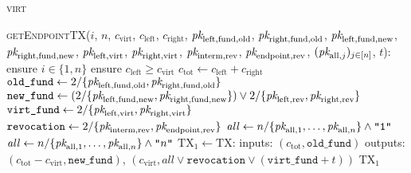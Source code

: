 \begin{center}
  \begin{processbox}{\textsc{virt}}
    \begin{algorithmic}[1]
      \State {}
      \State \textsc{getEndpointTX}($i$, $n$, $c_{\mathrm{virt}}$,
      $c_{\mathrm{left}}$, $c_{\mathrm{right}}$, $\textit{pk}_{\mathrm{left},
      \mathrm{fund}, \mathrm{old}}$, $\textit{pk}_{\mathrm{right}, \mathrm{fund},
      \mathrm{old}}$, $\textit{pk}_{\mathrm{left}, \mathrm{fund}, \mathrm{new}}$,
      $\textit{pk}_{\mathrm{right}, \mathrm{fund}, \mathrm{new}}$, $\textit{pk}_{\mathrm{left},
      \mathrm{virt}}$, $\textit{pk}_{\mathrm{right}, \mathrm{virt}}$,
      $\textit{pk}_{\mathrm{interm}, \mathrm{rev}}$, $\textit{pk}_{\mathrm{endpoint},
      \mathrm{rev}}$, $(\textit{pk}_{\mathrm{all}, j})_{j \in [n]}$, $t$):
      \Indent
        \State ensure $i \in \{1, n\}$
        \State ensure $c_{\mathrm{left}} \geq c_{\mathrm{virt}}$ 
        \State $c_{\mathrm{tot}} \gets c_{\mathrm{left}} + c_{\mathrm{right}}$
        \State $\texttt{old\_fund} \gets 2/\{\textit{pk}_{\mathrm{left}, \mathrm{fund},
        \mathrm{old}}, \textit{pk}_{\mathrm{right}, \mathrm{fund}, \mathrm{old}}\}$
        \State $\texttt{new\_fund} \gets (2/\{\textit{pk}_{\mathrm{left}, \mathrm{fund},
        \mathrm{new}}, \textit{pk}_{\mathrm{right}, \mathrm{fund}, \mathrm{new}}\}) \vee
        2/\{\textit{pk}_{\mathrm{left}, \mathrm{rev}}, \textit{pk}_{\mathrm{right},
        \mathrm{rev}}\}$
        \State $\texttt{virt\_fund} \gets 2/\{\textit{pk}_{\mathrm{left},
        \mathrm{virt}}, \textit{pk}_{\mathrm{right}, \mathrm{virt}}\}$
        \State $\texttt{revocation} \gets 2/\{\textit{pk}_{\mathrm{interm},
        \mathrm{rev}}, \textit{pk}_{\mathrm{endpoint}, \mathrm{rev}}\}$
         
          \State $\mathit{all} \gets n/\{\textit{pk}_{\mathrm{all}, 1}, \dots,
          \textit{pk}_{\mathrm{all}, n}\} \wedge \texttt{"1"}$
        \Else \: 
          \State $\mathit{all} \gets n/\{\textit{pk}_{\mathrm{all}, 1}, \dots,
          \textit{pk}_{\mathrm{all}, n}\} \wedge \texttt{"}n\texttt{"}$
        \EndIf
        \State $\mathrm{TX}_1 \gets \mathrm{TX}$: 
        \Indent
          \State inputs:
          \Indent
            \State $(c_{\mathrm{tot}}, \texttt{old\_fund})$
          \EndIndent
          \State outputs:
          \Indent
            \State $(c_{\mathrm{tot}} - c_{\mathrm{virt}}, \texttt{new\_fund})$,
            \label{code:virtual-layer:endpoint-txs:new-fund}
            \State $(c_{\mathrm{virt}}, \mathit{all} \vee \texttt{revocation}
            \vee (\texttt{virt\_fund} + t))$
            \label{code:virtual-layer:endpoint-txs:virt}
          \EndIndent
        \EndIndent
        \State \Return $\mathrm{TX}_1$
      \EndIndent
    \end{algorithmic}
  \end{processbox}
  \label{code:virtual-layer:endpoint-txs}
\end{center} \ \\

